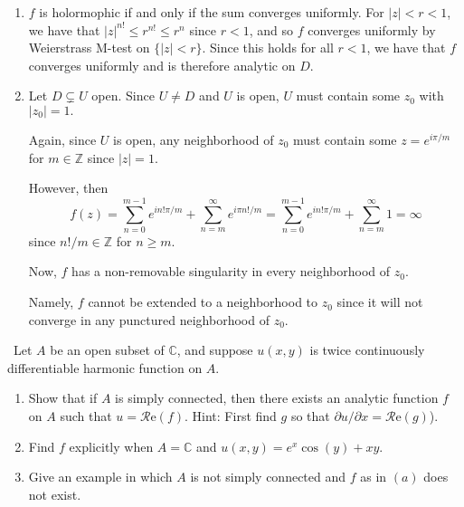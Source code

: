 \documentclass[12pt]{Homework}
\newcommand{\re}{\mathscr{R}\text{e}}
\begin{document}
\begin{solution}$\,$
\begin{enumerate}[label=(\alph*)]
    \item $f$ is holormophic if and only if the sum converges uniformly. For $|z|<r<1$, we have that $|z|^{n!}\le r^{n!}\le r^n$ since $r<1$, and so $f$ converges uniformly by Weierstrass M-test on $\{|z|<r\}.$ Since this holds for all $r<1$, we have that $f$ converges uniformly and is therefore analytic on $D.$
    \item Let $D\subsetneq U$ open. Since $U\not=D$ and $U$ is open, $U$ must contain some $z_0$ with $|z_0|=1.$ 
    
    Again, since $U$ is open, any neighborhood of $z_0$ must contain some $z=e^{i\pi/m}$ for $m\in\mathbb{Z}$ since $|z|=1.$
    
    However, then $$f(z)=\sum_{n=0}^{m-1}e^{in!\pi/m}+\sum_{n=m}^\infty e^{i\pi n!/m}=\sum_{n=0}^{m-1}e^{in!\pi/m}+\sum_{n=m}^\infty 1=\infty$$ since $n!/m\in\mathbb{Z}$ for $n\ge m.$ 
    
    Now, $f$ has a non-removable singularity in every neighborhood of $z_0$.
    
    Namely, $f$ cannot be extended to a neighborhood to $z_0$ since it will not converge in any punctured neighborhood of $z_0.$
\end{enumerate}
\end{solution}
\newpage




\begin{problem} $\,$
Let $A$ be an open subset of $\mathbb{C}$, and suppose $u(x,y)$ is twice continuously differentiable harmonic function on $A.$
\begin{enumerate}[label=(\alph*)]
    \item Show that if $A$ is simply connected, then there exists an analytic function $f$ on $A$ such that $u=\re(f).$ Hint: First find $g$ so that $\partial u/\partial x=\re(g)$).
    \item Find $f$ explicitly when $A=\mathbb{C}$ and $u(x,y)=e^x\cos(y)+xy$.
    \item Give an example in which $A$ is not simply connected and $f$ as in $(a)$ does not exist.
\end{enumerate}
\end{problem}
\end{document}
